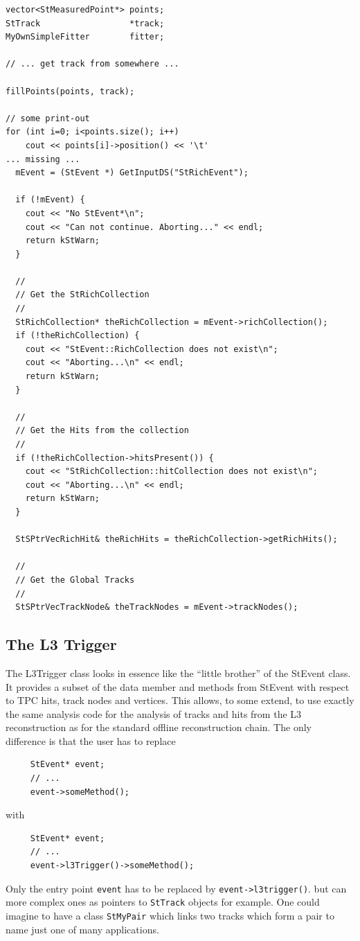 \documentclass[twoside]{article}
\begin{document}
\begin{verbatim}
vector<StMeasuredPoint*> points;
StTrack                  *track;
MyOwnSimpleFitter        fitter;

// ... get track from somewhere ...

fillPoints(points, track);

// some print-out
for (int i=0; i<points.size(); i++)
    cout << points[i]->position() << '\t'
... missing ...
  mEvent = (StEvent *) GetInputDS("StRichEvent");

  if (!mEvent) {
    cout << "No StEvent*\n";
    cout << "Can not continue. Aborting..." << endl;
    return kStWarn;
  }

  //
  // Get the StRichCollection
  // 
  StRichCollection* theRichCollection = mEvent->richCollection();
  if (!theRichCollection) {
    cout << "StEvent::RichCollection does not exist\n";
    cout << "Aborting...\n" << endl;
    return kStWarn;
  }

  //
  // Get the Hits from the collection
  //
  if (!theRichCollection->hitsPresent()) {
    cout << "StRichCollection::hitCollection does not exist\n";
    cout << "Aborting...\n" << endl;
    return kStWarn;
  }

  StSPtrVecRichHit& theRichHits = theRichCollection->getRichHits();

  //
  // Get the Global Tracks
  //
  StSPtrVecTrackNode& theTrackNodes = mEvent->trackNodes();
\end{verbatim}

\subsection{The L3 Trigger}

The L3Trigger class looks in essence like the ``little brother'' of
the StEvent class. It provides a subset of the data member and methods
from StEvent with respect to TPC hits, track nodes and vertices.  This
allows, to some extend, to use exactly the same analysis code for the
analysis of tracks and hits from the L3 reconstruction as for the
standard offline reconstruction chain.
The only difference is that
the user has to replace
\begin{verbatim}
     StEvent* event;
     // ...
     event->someMethod();
\end{verbatim}
with
\begin{verbatim}
     StEvent* event;
     // ...
     event->l3Trigger()->someMethod();
\end{verbatim}
Only the entry point \texttt{event} has to be replaced by \texttt{event->l3trigger()}.
but can more complex ones as pointers to \texttt{StTrack} objects for example.
One could imagine to have a class \texttt{StMyPair} which links two tracks which form
a pair to name just one of many applications. 
\end{document}
